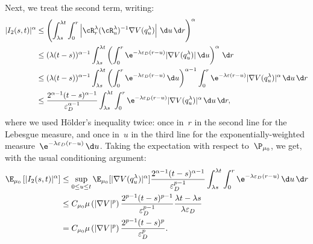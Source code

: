 Next, we treat the second term, writing:
\begin{equation}
    \begin{aligned}
    |I_2(s,t)|^\alpha &\leq \left(\int_{\lambda s}^{\lambda t}\int_{0}^r \left|\cR_r^\lambda(\cR_{u}^\lambda)^{-1} \nabla V(q_u^\lambda)\right|\,\d u\,\d r\right)^\alpha\\
    &\leq (\lambda(t-s))^{\alpha-1}\int_{\lambda s}^{\lambda t}\left(\int_0^r \e^{-\lambda\varepsilon_D(r-u)}|\nabla V(q_u^\lambda)|\,\d u\right)^\alpha\,\d r\\
    &\leq (\lambda(t-s))^{\alpha-1}\int_{\lambda s}^{\lambda t}\left(\int_{0}^r \e^{-\lambda\varepsilon_D(r-u)}\,\d u\right)^{\alpha-1}\int_{0}^r \e^{-\lambda\varepsilon(r-u)}|\nabla V(q_u^\lambda)|^\alpha\,\d u\,\d r\\
    &\leq \frac{2^{\alpha-1}(t-s)^{\alpha-1}}{\varepsilon_D^{\alpha-1}}\int_{\lambda s}^{\lambda t}\int_{0}^r \e^{-\lambda\varepsilon_D(r-u)}|\nabla V(q_u^\lambda)|^\alpha\,\d u\,\d r,
    \end{aligned}
\end{equation}
where we used Hölder's inequality twice: once in~$r$ in the second line for the Lebesgue measure, and once in~$u$ in the third line for the exponentially-weighted measure~$\e^{-\lambda\varepsilon_D(r-u)}\,\d u$.
Taking the expectation with respect to~$\P_{\mu_0}$, we get, with the usual conditioning argument:
\begin{equation}
    \label{05:eq:i2_estimate}
    \begin{aligned}
    \E_{\mu_0}\left[|I_2(s,t)|^\alpha\right] &\leq \underset{0\leq u\leq t}{\sup}\,\E_{\mu_0}[|\nabla V(q_u^\lambda)|^\alpha]\frac{2^{\alpha-1}(t-s)^{\alpha-1}}{\varepsilon_D^{p-1}}\int_{\lambda s}^{\lambda t}\int_0^r \e^{-\lambda \varepsilon_D(r-u)}\,\d u\,\d r\\
    &\leq C_{\mu_0}\mu\left(|\nabla V|^p\right)\frac{2^{p-1}(t-s)^{p-1}}{\varepsilon_D^{p-1}}\frac{\lambda t-\lambda s}{\lambda \varepsilon_D}\\
    &= C_{\mu_0}\mu\left(|\nabla V|^p\right)\frac{2^{p-1}(t-s)^p}{\varepsilon_D^p}.
    \end{aligned}
\end{equation}

